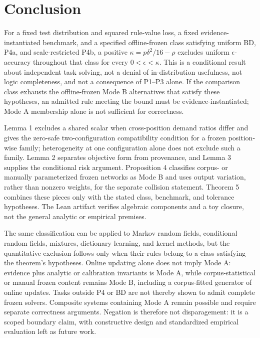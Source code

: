 \documentclass[twoside,11pt]{article}
\begin{document}
\section{Conclusion}
\label{ch:conclusion}

For a fixed test distribution and squared rule-value loss, a fixed evidence-instantiated benchmark, and a specified offline-frozen class satisfying uniform BD, P4a, and scale-restricted P4b, a positive $\kappa=p\delta^2/16-\rho$ excludes uniform $\epsilon$-accuracy throughout that class for every $0<\epsilon<\kappa$. This is a conditional result about independent task solving, not a denial of in-distribution usefulness, not logic completeness, and not a consequence of P1--P3 alone. If the comparison class exhausts the offline-frozen Mode B alternatives that satisfy these hypotheses, an admitted rule meeting the bound must be evidence-instantiated; Mode A membership alone is not sufficient for correctness.

Lemma 1 excludes a shared scalar when cross-position demand ratios differ and gives the zero-safe two-configuration compatibility condition for a frozen position-wise family; heterogeneity at one configuration alone does not exclude such a family. Lemma 2 separates objective form from provenance, and Lemma 3 supplies the conditional risk argument. Proposition 4 classifies corpus- or manually parameterized frozen networks as Mode B and uses output variation, rather than nonzero weights, for the separate collision statement. Theorem 5 combines these pieces only with the stated class, benchmark, and tolerance hypotheses. The Lean artifact verifies algebraic components and a toy closure, not the general analytic or empirical premises.

The same classification can be applied to Markov random fields, conditional random fields, mixtures, dictionary learning, and kernel methods, but the quantitative exclusion follows only when their rules belong to a class satisfying the theorem's hypotheses. Online updating alone does not imply Mode A: evidence plus analytic or calibration invariants is Mode A, while corpus-statistical or manual frozen content remains Mode B, including a corpus-fitted generator of online updates. Tasks outside P4 or BD are not thereby shown to admit complete frozen solvers. Composite systems containing Mode A remain possible and require separate correctness arguments. Negation is therefore not disparagement: it is a scoped boundary claim, with constructive design and standardized empirical evaluation left as future work.
\end{document}
